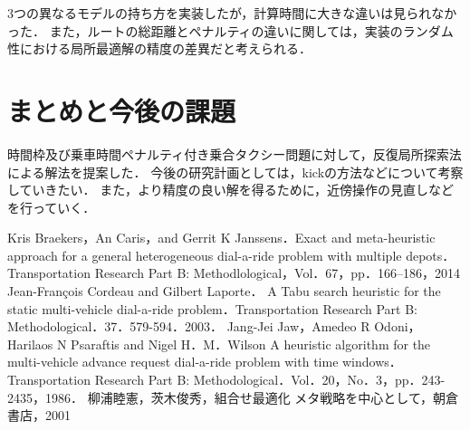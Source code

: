 \documentclass[a4j,11pt,twocolumn]{jsarticle}
\begin{document}
3つの異なるモデルの持ち方を実装したが，計算時間に大きな違いは見られなかった．
また，ルートの総距離とペナルティの違いに関しては，実装のランダム性における局所最適解の精度の差異だと考えられる．


\section{まとめと今後の課題}
時間枠及び乗車時間ペナルティ付き乗合タクシー問題に対して，反復局所探索法による解法を提案した．
今後の研究計画としては，kickの方法などについて考察していきたい．
また，より精度の良い解を得るために，近傍操作の見直しなどを行っていく．

\begin{thebibliography}{99}
   Kris Braekers，An Caris，and Gerrit K Janssens．Exact and meta-heuristic approach for a general heterogeneous dial-a-ride problem with multiple depots．Transportation Research Part B: Methodlological，Vol．67，pp．166--186，2014
   Jean-François Cordeau and Gilbert Laporte． \，A Tabu search heuristic for the static multi-vehicle dial-a-ride problem．Transportation Research Part B: Methodological．37．579-594．2003．
   Jang-Jei Jaw，Amedeo R Odoni，Harilaos N Psaraftis and Nigel H．M．Wilson \，A heuristic algorithm for the multi-vehicle advance request dial-a-ride problem with time windows．Transportation Research Part B: Methodological．Vol．20，No．3，pp．243-2435，1986．
   柳浦睦憲，茨木俊秀，組合せ最適化 メタ戦略を中心として，朝倉書店，2001
\end{thebibliography}
\end{document}
